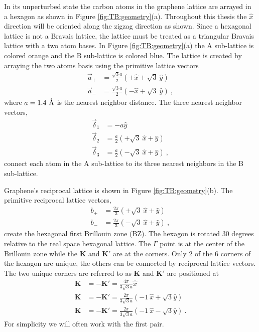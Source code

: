 In its unperturbed state the carbon atoms in the graphene lattice are arrayed in a hexagon as shown in Figure \ref{fig:TB:geometry}(a).
Throughout this thesis the $\hat x$ direction will be oriented along the zigzag direction as shown.
Since a hexagonal lattice is not a Bravais lattice, the lattice must be treated as a triangular Bravais lattice with a two atom bases.
In Figure \ref{fig:TB:geometry}(a) the A sub-lattice is colored orange and the B sub-lattice is colored blue.
The lattice is created by arraying the two atoms basis using the primitive lattice vectors 
\begin{align*}
	\vec{a}_+&= \frac{\sqrt{3}a}{2} \left( +\hat{x} + \sqrt{3} \ \hat{y} \right) \\
	\vec{a}_-&= \frac{\sqrt{3}a}{2} \left( -\hat{x} + \sqrt{3} \ \hat{y} \right) \ ,
\end{align*}
where $a=1.4 \ \textup{\AA}$ is the nearest neighbor distance.
The three nearest neighbor vectors,
\begin{align*}
	\vec \delta_1&=-a \hat{y} \\
	\vec \delta_2&= \frac{a}{2} \left( +\sqrt{3} \ \hat{x}+\hat{y} \right)\\
	\vec \delta_3&= \frac{a}{2} \left( -\sqrt{3} \ \hat{x}+\hat{y} \right) \ ,
\end{align*}
connect each atom in the A sub-lattice to its three nearest neighbors in the B sub-lattice.

Graphene's reciprocal lattice is shown in Figure \ref{fig:TB:geometry}(b).
The primitive reciprocal lattice vectors, 
\begin{align*}
	b_+&=\frac{2 \pi}{3} \left(+\sqrt{3} \ \hat{x} + \hat{y} \right) \\ 
	b_-&=\frac{2 \pi}{3} \left(-\sqrt{3} \ \hat{x} + \hat{y} \right) \ ,
\end{align*} 
create the hexagonal first Brillouin zone (BZ).
The hexagon is rotated 30 degrees relative to the real space hexagonal lattice.
The $\Gamma$ point is at the center of the Brillouin zone while the $\bm{K}$ and $\bm{K'}$ are at the corners.
Only 2 of the 6 corners of the hexagon are unique, the others can be connected by reciprocal lattice vectors.
The two unique corners are referred to as $\bm{K}$ and $\bm{K'}$ are positioned at
\begin{align*}
	\bm{K}&=-\bm{K'}= \frac{4 \pi}{3 \sqrt{3} a} \hat{x} \\
	\bm{K}&=-\bm{K'}= \frac{2 \pi}{3 \sqrt{3} a} \left( -1 \ \hat{x} + \sqrt{3} \hat{y} \right)\\
	\bm{K}&=-\bm{K'}= \frac{2 \pi}{3 \sqrt{3} a} \left( -1 \ \hat{x} - \sqrt{3} \hat{y} \right) \ .
\end{align*}
For simplicity we will often work with the first pair.

